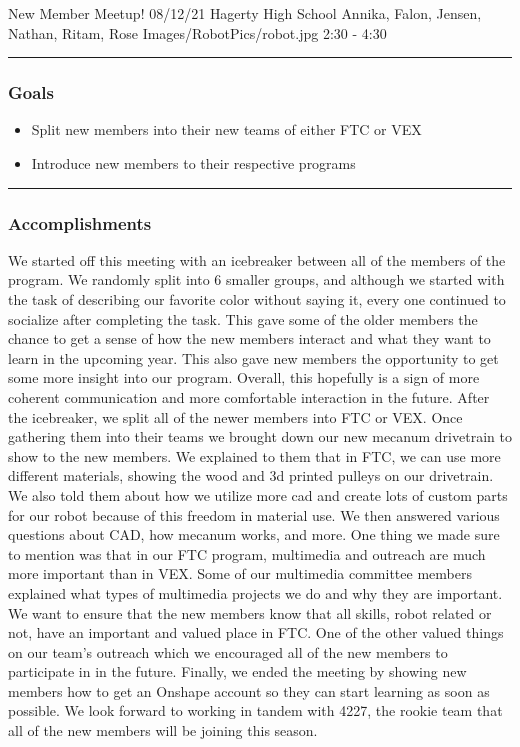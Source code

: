 \insertmeeting 
	{New Member Meetup!} 
	{08/12/21}
	{Hagerty High School}
	{Annika, Falon, Jensen, Nathan, Ritam, Rose}
	{Images/RobotPics/robot.jpg}
	{2:30 - 4:30}
	
\noindent\hfil\rule{\textwidth}{.4pt}\hfil
\subsubsection*{Goals}
\begin{itemize}
    \item Split new members into their new teams of either FTC or VEX
	\item Introduce new members to their respective programs  

\end{itemize} 

\noindent\hfil\rule{\textwidth}{.4pt}\hfil

\subsubsection*{Accomplishments}
We started off this meeting with an icebreaker between all of the members of the program. We randomly split into 6 smaller groups, and although we started with the task of describing our favorite color without saying it, every one continued to socialize after completing the task. This gave some of the older members the chance to get a sense of how the new members interact and what they want to learn in the upcoming year. This also gave new members the opportunity to get some more insight into our program. Overall, this hopefully is a sign of more coherent communication and more comfortable interaction in the future.
After the icebreaker, we split all of the newer members into FTC or VEX. Once gathering them into their teams we brought down our new mecanum drivetrain to show to the new members. We explained to them that in FTC, we can use more different materials, showing the wood and 3d printed pulleys on our drivetrain. We also told them about how we utilize more cad and create lots of custom parts for our robot because of this freedom in material use. We then answered various questions about CAD, how mecanum works, and more.
One thing we made sure to mention was that in our FTC program, multimedia and outreach are much more important than in VEX. Some of our multimedia committee members explained what types of multimedia projects we do and why they are important. We want to ensure that the new members know that all skills, robot related or not, have an important and valued place in FTC. One of the other valued things on our team's outreach which we encouraged all of the new members to participate in in the future.
Finally, we ended the meeting by showing new members how to get an Onshape account so they can start learning as soon as possible. We look forward to working in tandem with 4227, the rookie team that all of the new members will be joining this season.

